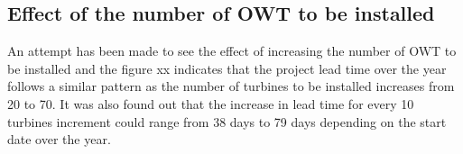 \subsection{Effect of the number of OWT to be installed}

An attempt has been made to see the effect of increasing the number of OWT to be installed and the figure xx indicates that the project lead time over the year follows a similar pattern as the number of turbines to be installed increases from 20 to 70. It was also found out that the increase in lead time for every 10 turbines increment could range from 38 days to 79 days depending on the start date over the year.  